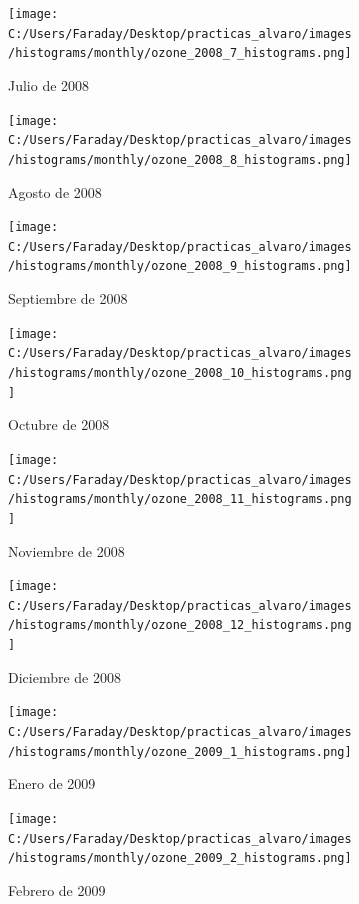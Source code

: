 \documentclass[12pt]{article}
\begin{document}
\newpage

\begin{figure}[H]
\centering
\begin{subfigure}[h]{0.45\textwidth}
\texttt{[image: C:/Users/Faraday/Desktop/practicas\_alvaro/images/histograms/monthly/ozone\_2008\_7\_histograms.png]}
\caption{Julio de 2008}
\label{fig:hist-mon-2-7-2008}
\end{subfigure}
%
\begin{subfigure}[H]{0.45\textwidth}
\texttt{[image: C:/Users/Faraday/Desktop/practicas\_alvaro/images/histograms/monthly/ozone\_2008\_8\_histograms.png]}
\caption{Agosto de 2008}
\label{fig:hist-mon-2-8-2008}
\end{subfigure}
\caption{}
\end{figure}

\begin{figure}[H]
\centering
\begin{subfigure}[h]{0.45\textwidth}
\texttt{[image: C:/Users/Faraday/Desktop/practicas\_alvaro/images/histograms/monthly/ozone\_2008\_9\_histograms.png]}
\caption{Septiembre de 2008}
\label{fig:hist-mon-2-9-2008}
\end{subfigure}
%
\begin{subfigure}[H]{0.45\textwidth}
\texttt{[image: C:/Users/Faraday/Desktop/practicas\_alvaro/images/histograms/monthly/ozone\_2008\_10\_histograms.png]}
\caption{Octubre de 2008}
\label{fig:hist-mon-2-10-2008}
\end{subfigure}
\caption{}
\end{figure}

\begin{figure}[H]
\centering
\begin{subfigure}[h]{0.45\textwidth}
\texttt{[image: C:/Users/Faraday/Desktop/practicas\_alvaro/images/histograms/monthly/ozone\_2008\_11\_histograms.png]}
\caption{Noviembre de 2008}
\label{fig:hist-mon-2-11-2008}
\end{subfigure}
%
\begin{subfigure}[H]{0.45\textwidth}
\texttt{[image: C:/Users/Faraday/Desktop/practicas\_alvaro/images/histograms/monthly/ozone\_2008\_12\_histograms.png]}
\caption{Diciembre de 2008}
\label{fig:hist-mon-2-12-2008}
\end{subfigure}
\caption{}
\end{figure}

\newpage

\begin{figure}[H]
\centering
\begin{subfigure}[h]{0.45\textwidth}
\texttt{[image: C:/Users/Faraday/Desktop/practicas\_alvaro/images/histograms/monthly/ozone\_2009\_1\_histograms.png]}
\caption{Enero de 2009}
\label{fig:hist-mon-2-1-2009}
\end{subfigure}
%
\begin{subfigure}[H]{0.45\textwidth}
\texttt{[image: C:/Users/Faraday/Desktop/practicas\_alvaro/images/histograms/monthly/ozone\_2009\_2\_histograms.png]}
\caption{Febrero de 2009}
\label{fig:hist-mon-2-2-2009}
\end{subfigure}
\caption{}
\end{figure}
\end{document}
